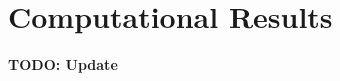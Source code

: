 \documentclass[11pt]{amsart}
\begin{document}
\section{Computational Results}\label{sec:results}

\textbf{TODO: Update}


\end{document}
